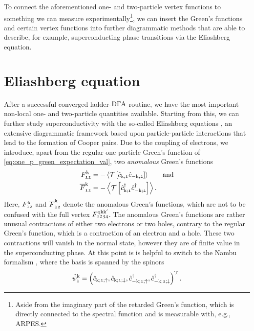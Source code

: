 \documentclass[../../main.tex]{subfiles}
\begin{document}
To connect the aforementioned one- and two-particle vertex functions to something we can measure experimentally\footnote{Aside from the imaginary part of the retarded Green's function, which is directly connected to the spectral function and is measurable with, e.g., ARPES.}, we can insert the Green's functions and certain vertex functions into further diagrammatic methods that are able to describe, for example, superconducting phase transitions via the Eliashberg equation.

\section{Eliashberg equation}

After a successful converged ladder-$\text{D}\Gamma\text{A}$ routine, we have the most important non-local one- and two-particle quantities available. Starting from this, we can further study superconductivity with the so-called Eliashberg equations \cite{eliashberg original paper}, an extensive diagrammatic framework based upon particle-particle interactions that lead to the formation of Cooper pairs. 
Due to the coupling of electrons, we introduce, apart from the regular one-particle Green's function of \eqref{eq:one_p_green_expectation_val}, two \textit{anomalous} Green's functions \cite{interorbital singlet pairing}
\begin{subequations}
\begin{align}
	F_{\mathfrak{12}}^{\text{k}}&=-\left\langle \mathcal{T}\left [\hat{c}_{\text{k};\mathfrak{1}}\hat{c}_{-\text{k};\mathfrak{2}}\right ]\right\rangle \qquad\text{and}\\
	\overline{F}_{\mathfrak{12}}^{\text{k}}&=-\left\langle \mathcal{T}\left [\hat{c}^{\dagger}_{\text{k};\mathfrak{1}}\hat{c}^{\dagger}_{-\text{k};\mathfrak{2}}\right ]\right\rangle.
\end{align}
\end{subequations}
Here, $F_{\mathfrak{12}}^{\text{k}}$ and $\overline{F}_{\mathfrak{12}}^{\text{k}}$ denote the anomalous Green's functions, which are not to be confused with the full vertex $F^{\text{q}\text{k}\text{k}'}_{\mathfrak{1234}}$. The anomalous Green's functions are rather unusual contractions of either two electrons or two holes, contrary to the regular Green's function, which is a contraction of an electron and a hole. These two contractions will vanish in the normal state, however they are of finite value in the superconducting phase. At this point is is helpful to switch to the Nambu formalism \cite{nambu}, where the basis is spanned by the spinors
\begin{align}
	\hat\psi_{\mathfrak{1}}^{\text{k}}=\left (\hat{c}_{\text{k};\mathfrak{1};\uparrow}, \hat{c}_{\text{k};\mathfrak{1};\downarrow},\hat{c}^{\dagger}_{-\text{k};\mathfrak{1};\uparrow},\hat{c}^{\dagger}_{-\text{k};\mathfrak{1};\downarrow}\right )^{\text{T}}.
\end{align}
\end{document}

